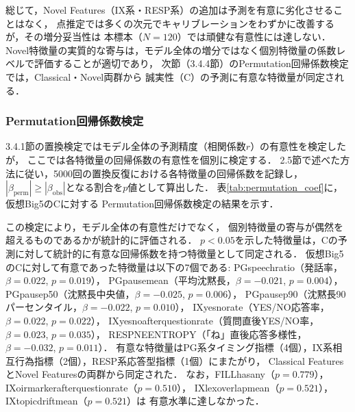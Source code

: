 \documentclass[dvipdfmx,11pt,a4paper]{bxjsarticle}
\renewcommand{\_}{\paperorigunderscore\allowbreak}%
\begin{document}
総じて，Novel Features（IX系・RESP系）の追加は予測を有意に劣化させることはなく，
点推定では多くの次元でキャリブレーションをわずかに改善するが，その増分妥当性は
本標本（$N=120$）では頑健な有意性には達しない．
Novel特徴量の実質的な寄与は，モデル全体の増分ではなく個別特徴量の係数レベルで評価することが適切であり，
次節（3.4.4節）のPermutation回帰係数検定では，Classical・Novel両群から
誠実性（C）の予測に有意な特徴量が同定される．

\subsubsection{Permutation回帰係数検定}
\label{sec:result_permutation_coef}

3.4.1節の置換検定ではモデル全体の予測精度（相関係数$r$）の有意性を検定したが，
ここでは各特徴量の回帰係数の有意性を個別に検定する．
2.5節で述べた方法に従い，5000回の置換反復における各特徴量の回帰係数を記録し，
$|\beta_{\text{perm}}| \geq |\beta_{\text{obs}}|$となる割合を$p$値として算出した．
表\ref{tab:permutation_coef}に，仮想Big5のCに対する
Permutation回帰係数検定の結果を示す．

\begin{table}[htbp]
\centering
\caption{Permutation回帰係数検定結果（仮想Big5, C）．
各特徴量の観測回帰係数$\beta_{\text{obs}}$および$p$値を示す．
太字は$p < 0.05$．}
\label{tab:permutation_coef}

\end{table}

この検定により，モデル全体の有意性だけでなく，
個別特徴量の寄与が偶然を超えるものであるかが統計的に評価される．
$p < 0.05$を示した特徴量は，Cの予測に対して統計的に有意な回帰係数を持つ特徴量として同定される．
仮想Big5のCに対して有意であった特徴量は以下の7個である:
PG\_speech\_ratio（発話率，$\beta = 0.022$, $p = 0.019$），
PG\_pause\_mean（平均沈黙長，$\beta = -0.021$, $p = 0.004$），
PG\_pause\_p50（沈黙長中央値，$\beta = -0.025$, $p = 0.006$），
PG\_pause\_p90（沈黙長90パーセンタイル，$\beta = -0.022$, $p = 0.010$），
IX\_yesno\_rate（YES/NO応答率，$\beta = 0.022$, $p = 0.022$），
IX\_yesno\_after\_question\_rate（質問直後YES/NO率，$\beta = 0.023$, $p = 0.035$），
RESP\_NE\_ENTROPY（「ね」直後応答多様性，$\beta = -0.032$, $p = 0.011$）．
有意な特徴量はPG系タイミング指標（4個），IX系相互行為指標（2個），RESP系応答型指標（1個）にまたがり，
Classical FeaturesとNovel Featuresの両群から同定された．
なお，FILL\_has\_any（$p = 0.779$），IX\_oirmarker\_after\_question\_rate（$p = 0.510$），
IX\_lex\_overlap\_mean（$p = 0.521$），IX\_topic\_drift\_mean（$p = 0.521$）は
有意水準に達しなかった．
\end{document}
